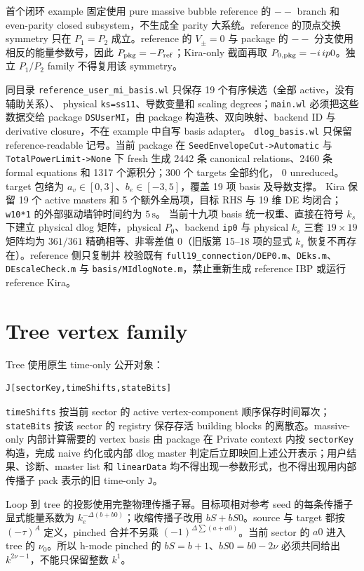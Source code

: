 ﻿\documentclass[a4paper,11pt]{article}
\begin{document}
首个闭环 example 固定使用 pure massive bubble reference 的 $--$ branch 和 even-parity closed subsystem，不生成全 parity 大系统。reference 的顶点交换 symmetry 只在 $P_1=P_2$ 成立。reference 的 $V_{\pm}=0$ 与 package 的 $--$ 分支使用相反的能量参数号，因此 $P_{\rm pkg}=-P_{\rm ref}$；Kira-only 截面再取 $P_{0,\rm pkg}=-i\,ip0$。独立 $P_1/P_2$ family 不得复用该 symmetry。

同目录 \texttt{reference\_user\_mi\_basis.wl} 只保存 19 个有序候选（全部 active，没有辅助关系）、
physical \texttt{ks=ss11}、导数变量和 scaling degrees；\texttt{main.wl} 必须把这些数据交给 package \texttt{DSUserMI}，由 package 构造秩、双向映射、backend ID 与 derivative closure，不在 example 中自写 basis adapter。
\texttt{dlog\_basis.wl} 只保留 reference-readable 记号。当前 package 在
\texttt{SeedEnvelopeCut->Automatic} 与 \texttt{TotalPowerLimit->None} 下 fresh 生成
2442 条 canonical relations、2460 条 formal equations 和 1317 个源积分；300 个 targets 全部约化，
0 unreduced。target 包络为 $a_v\in[0,3]$、$b_e\in[-3,5]$，覆盖 19 项 basis 及导数支撑。
Kira 保留 19 个 active masters 和 5 个额外全局项，目标 RHS 与 19 维 DE 均闭合；
\texttt{w10*1} 的外部驱动墙钟时间约为 $5\,\mathrm{s}$。
当前十九项 basis 统一权重、直接在符号 $k_s$ 下建立 physical dlog 矩阵，physical $P_0$、backend \texttt{ip0}
与 physical $k_s$ 三套 $19\times19$ 矩阵均为 $361/361$ 精确相等、非零差值 0（旧版第 15--18 项的显式 $k_s$ 恢复不再存在）。reference 侧只复制并
校验既有 \texttt{full19\_connection/DEP0.m}、\texttt{DEks.m}、\texttt{DEscaleCheck.m} 与 \texttt{basis/MIdlogNote.m}，禁止重新生成
reference IBP 或运行 reference Kira。

\section{Tree vertex family}

Tree 使用原生 time-only 公开对象：
\begin{verbatim}
J[sectorKey,timeShifts,stateBits]
\end{verbatim}
\texttt{timeShifts} 按当前 sector 的 active vertex-component 顺序保存时间幂次；\texttt{stateBits} 按该 sector 的 registry 保存存活 building blocks 的离散态。massive-only 内部计算需要的 vertex basis 由 package 在 Private context 内按 \texttt{sectorKey} 构造，完成 naive 约化或内部 dlog master 判定后立即映回上述公开表示；用户结果、诊断、master list 和 \texttt{linearData} 均不得出现一参数形式，也不得出现用内部传播子 pack 表示的旧 time-only \texttt{J}。

Loop 到 tree 的投影使用完整物理传播子幂。目标项相对参考 seed 的每条传播子显式能量系数为 $k_e^{-\Delta(b+b0)}$；收缩传播子改用 $bS+bS0$。source 与 target 都按 $(-\tau)^A$ 定义，pinched 合并不另乘 $(-1)^{\Delta\sum(a+a0)}$。当前 sector 的 $a0$ 进入 tree 的 $\nu_0$。所以 h-mode pinched 的 $bS=b+1$、$bS0=b0-2\nu$ 必须共同给出 $k^{2\nu-1}$，不能只保留整数 $k^{1}$。
\end{document}
